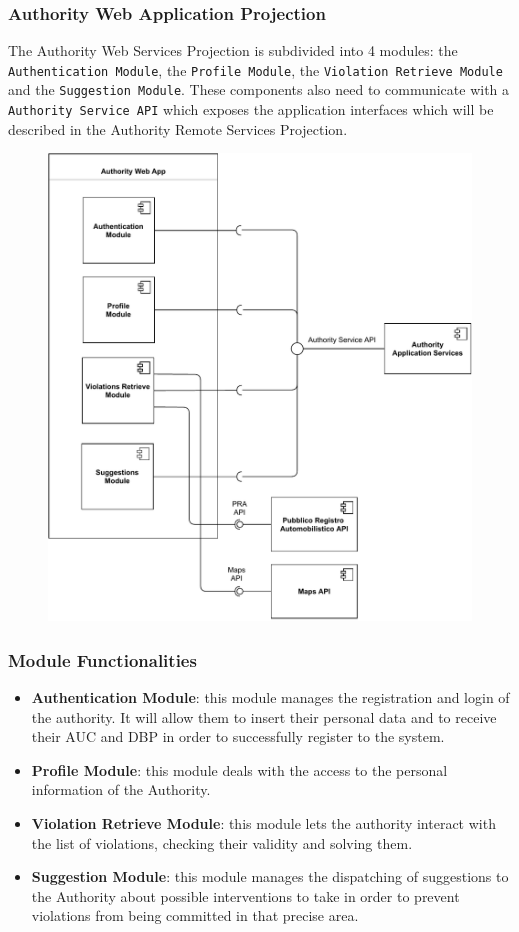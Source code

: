 \documentclass[12pt,a4paper]{article}
\begin{document}
\subsubsection{Authority Web Application Projection}
The Authority Web Services Projection is subdivided into 4 modules: the \texttt{Authentication Module}, the \texttt{Profile Module}, the \texttt{Violation Retrieve Module} and the \texttt{Suggestion Module}. These components also need to communicate with a \texttt{Authority Service API} which exposes the application interfaces which will be described in the Authority Remote Services Projection.
\begin{figure}[H]
		\centering
		\includegraphics[width=1.1\linewidth]{../assets/images/Authority_webapp_projection.pdf}
	\end{figure}
\newpage
\subsubsection*{Module Functionalities}
\begin{itemize}
\item \textbf{Authentication Module}: this module manages the registration and login of the authority. It will allow them to insert their personal data and to receive their AUC and DBP in order to successfully register to the system.
\item \textbf{Profile Module}: this module deals with the access to the personal information of the Authority.
\item \textbf{Violation Retrieve Module}: this module lets the authority interact with the list of violations, checking their validity and solving them. 
\item \textbf{Suggestion Module}: this module manages the dispatching of suggestions to the Authority about possible interventions to take in order to prevent violations from being committed in that precise area.
\end{itemize}
\end{document}
